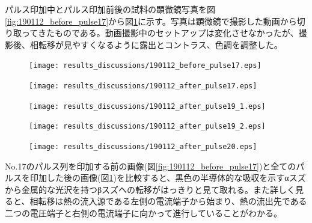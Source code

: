 パルス印加中とパルス印加前後の試料の顕微鏡写真を図\ref{fig:190112_before_pulse17}から図\ref{fig:190112_after_pulse20}に示す。写真は顕微鏡で撮影した動画から切り取ってきたものである。動画撮影中のセットアップは変化させなかったが、撮影後、相転移が見やすくなるように露出とコントラス、色調を調整した。
\begin{figure}[htbp]
 \begin{minipage}{0.5\hsize}
  \begin{center}
   \texttt{[image: results\_discussions/190112\_before\_pulse17.eps]}
  \end{center}
  \caption{}
  \label{fig:190112_before_pulse17}
 \end{minipage}
 \begin{minipage}{0.5\hsize}
  \begin{center}
   \texttt{[image: results\_discussions/190112\_after\_pulse17.eps]}
  \end{center}
  \caption{}
  \label{fig:190112_after_pulse17}
 \end{minipage}
  \begin{minipage}{0.5\hsize}
  \begin{center}
   \texttt{[image: results\_discussions/190112\_after\_pulse19\_1.eps]}
  \end{center}
  \caption{}
  \label{fig:190112_after_pulse19_1}
 \end{minipage}
  \begin{minipage}{0.5\hsize}
  \begin{center}
   \texttt{[image: results\_discussions/190112\_after\_pulse19\_2.eps]}
  \end{center}
  \caption{}
  \label{fig:190112_after_pulse19_2}
 \end{minipage}
  \begin{minipage}{0.5\hsize}
  \begin{center}
   \texttt{[image: results\_discussions/190112\_after\_pulse20.eps]}
  \end{center}
  \caption{}
  \label{fig:190112_after_pulse20}
 \end{minipage}
\end{figure}
No.17のパルス列を印加する前の画像(図\ref{fig:190112_before_pulse17})と全てのパルスを印加した後の画像(図\ref{fig:190112_after_pulse20})を比較すると、黒色の半導体的な吸収を示すαスズから金属的な光沢を持つβスズへの転移がはっきりと見て取れる。また詳しく見ると、相転移は熱の流入源である左側の電流端子から始まり、熱の流出先である二つの電圧端子と右側の電流端子に向かって進行していることがわかる。


